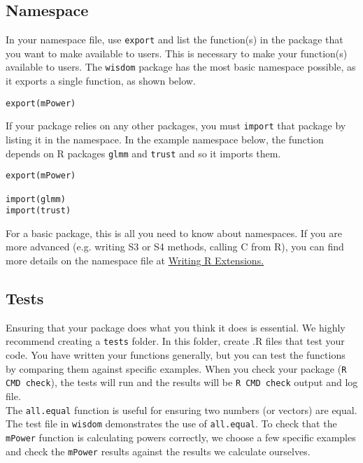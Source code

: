 \documentclass{article}
\begin{document}
\subsection{Namespace} In your namespace file, use  \texttt{export} and list the function(s) in the package that you want to make available to users. This is necessary to make your function(s) available to users. The  \texttt{wisdom} package has the most basic namespace possible, as it exports a single function, as shown below.

\begin{verbatim}
export(mPower)
\end{verbatim}

If your package relies on any other packages, you must \texttt{import} that package by listing it in the namespace. In the example namespace below, the function depends on R packages \texttt{glmm} and \texttt{trust} and so it imports them.

\begin{verbatim}
export(mPower)

import(glmm)
import(trust)
\end{verbatim}

For a basic package, this is all you need to know about namespaces. If you are more advanced (e.g. writing S3 or S4 methods, calling C from R), you can find more details on the namespace file at  \href{https://cran.r-project.org/doc/manuals/R-exts.html#Package-namespaces}{Writing R Extensions.}

\subsection{Tests}\label{sec:tests} Ensuring that your package does what you think it does is essential. We highly recommend creating a \texttt{tests} folder. In this folder, create .R files that test your code. 
You have written your functions generally, but you can test the functions by comparing them against specific examples. When you check your package (\texttt{R CMD check}), the tests will run and the results will be  \texttt{R CMD check} output and log file.\\

 The \texttt{all.equal} function is useful for ensuring two numbers (or vectors) are equal. The test file in \texttt{wisdom} demonstrates the use of \texttt{all.equal}. To check that the \texttt{mPower} function is calculating  powers correctly, we choose a few specific examples and check the \texttt{mPower} results against the results we calculate ourselves.\\
\end{document}
